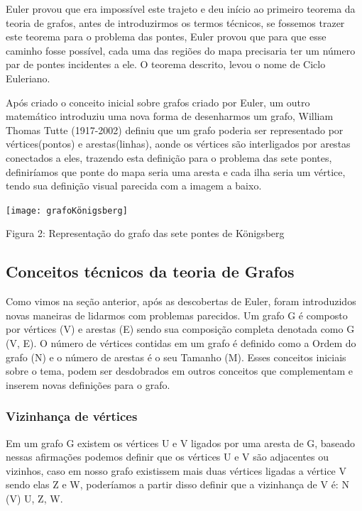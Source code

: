 \documentclass[12pt]{article}
\begin{document}
   Euler provou que era impossível este trajeto e deu início ao primeiro teorema da teoria de grafos, antes de introduzirmos os termos técnicos, se fossemos trazer este teorema para o problema das pontes, Euler provou que para que esse caminho fosse possível, cada uma das regiões do mapa precisaria ter um número par de pontes incidentes a ele. O teorema descrito, levou o nome de Ciclo Euleriano.
   
   Após criado o conceito inicial sobre grafos criado por Euler, um outro matemático introduziu uma nova forma de desenharmos um grafo, William Thomas Tutte (1917-2002) definiu que um grafo poderia ser representado por vértices(pontos) e arestas(linhas), aonde os vértices são interligados por arestas conectados a eles, trazendo esta definição para o problema das sete pontes, definiríamos que ponte do mapa seria uma aresta e cada ilha seria um vértice, tendo sua definição visual parecida com a imagem a baixo.
   
   {\centering  \texttt{[image: grafoKönigsberg]}\par} 
   
   Figura 2:  Representação do grafo das sete pontes de Königsberg
   
   	\subsection{Conceitos técnicos da teoria de Grafos}
   	
   	Como vimos na seção anterior, após as descobertas de Euler, foram introduzidos novas maneiras de lidarmos com problemas parecidos.
   	Um grafo G é composto por vértices (V) e arestas (E) sendo sua composição completa denotada como G (V, E). O número de vértices contidas em um grafo é definido como a Ordem do grafo (N) e o número de arestas é o seu Tamanho (M). Esses conceitos iniciais sobre o tema, podem ser desdobrados em outros conceitos que complementam e inserem novas definições para o grafo.
   	
   	\subsubsection{Vizinhança de vértices}
   	
   	Em um grafo G existem os vértices U e V ligados por uma aresta de G, baseado nessas afirmações podemos definir que os vértices U e V são adjacentes ou vizinhos, caso em nosso grafo existissem mais duas vértices ligadas a vértice V sendo elas Z e W, poderíamos a partir disso definir que a vizinhança de V é: N (V) {U, Z, W}. 
   	
\end{document}
